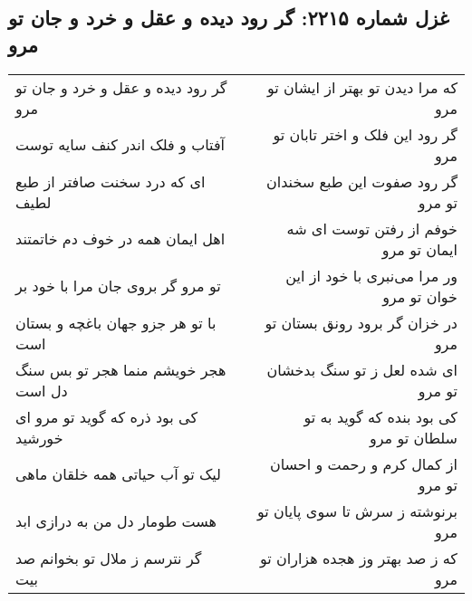 \begin{center}
\section*{غزل شماره ۲۲۱۵: گر رود دیده و عقل و خرد و جان تو مرو}
\label{sec:2215}
\begin{longtable}{l p{0.5cm} r}
گر رود دیده و عقل و خرد و جان تو مرو
&&
که مرا دیدن تو بهتر از ایشان تو مرو
\\
آفتاب و فلک اندر کنف سایه توست
&&
گر رود این فلک و اختر تابان تو مرو
\\
ای که درد سخنت صافتر از طبع لطیف
&&
گر رود صفوت این طبع سخندان تو مرو
\\
اهل ایمان همه در خوف دم خاتمتند
&&
خوفم از رفتن توست ای شه ایمان تو مرو
\\
تو مرو گر بروی جان مرا با خود بر
&&
ور مرا می‌نبری با خود از این خوان تو مرو
\\
با تو هر جزو جهان باغچه و بستان است
&&
در خزان گر برود رونق بستان تو مرو
\\
هجر خویشم منما هجر تو بس سنگ دل است
&&
ای شده لعل ز تو سنگ بدخشان تو مرو
\\
کی بود ذره که گوید تو مرو ای خورشید
&&
کی بود بنده که گوید به تو سلطان تو مرو
\\
لیک تو آب حیاتی همه خلقان ماهی
&&
از کمال کرم و رحمت و احسان تو مرو
\\
هست طومار دل من به درازی ابد
&&
برنوشته ز سرش تا سوی پایان تو مرو
\\
گر نترسم ز ملال تو بخوانم صد بیت
&&
که ز صد بهتر وز هجده هزاران تو مرو
\\
\end{longtable}
\end{center}
